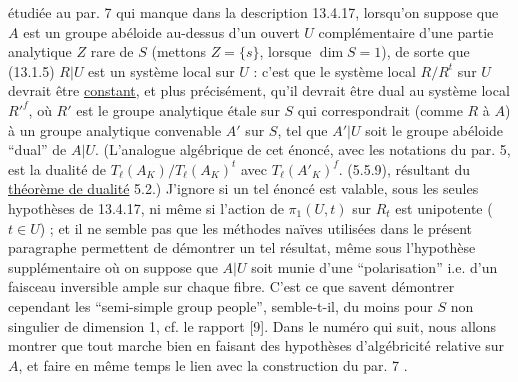 
étudiée au par. 7 qui manque dans la description 13.4.17, lorsqu'on suppose que $A$ est un groupe abéloide au-dessus d'un ouvert $U$ complémentaire d'une partie analytique $Z$ rare de $S$ (mettons $Z = \{s\}$, lorsque $\dim S = 1$), de sorte que (13.1.5) $R|U$ est un système local sur $U$ : c'est que le système local $R/R^t$ sur $U$ devrait être \underline{constant}, et plus précisément, qu'il devrait être dual au système local ${R'}^{f}$, où $R'$ est le groupe analytique étale sur $S$ qui correspondrait (comme $R$ à $A$) à un groupe analytique convenable $A'$ sur $S$, tel que $A'|U$ soit le groupe abéloide ``dual'' de $A|U$. (L'analogue algébrique de cet énoncé, avec les notations du par. 5, est la dualité de $T_{\ell}(A_K)/T_{\ell}(A_K)^t$ avec $T_{\ell}(A'_K)^f$. (5.5.9), résultant du \underline{théorème de dualité} 5.2.) J'ignore si un tel énoncé est valable, sous les seules hypothèses de 13.4.17, ni même si l'action de $\pi_1(U,t)$ sur $R_t$ est unipotente ($t \in U$) ; et il ne semble pas que les méthodes naïves utilisées dans le présent paragraphe permettent de démontrer un tel résultat, même sous l'hypothèse supplémentaire où on suppose que $A|U$ soit munie d'une ``polarisation'' i.e. d'un faisceau inversible ample sur chaque fibre. C'est ce que savent démontrer cependant les ``semi-simple group people'', semble-t-il, du moins pour $S$ non singulier de dimension 1, cf. le rapport [9]. Dans le numéro qui suit, nous allons montrer que tout marche bien en faisant des hypothèses d'algébricité relative sur $A$, et faire en même temps le lien avec la construction du par. 7 .



